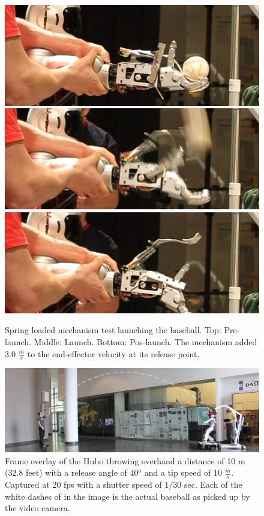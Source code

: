 \begin{figure}[t]
  \centering
\includegraphics[width=1.0\columnwidth]{./pix/finalSpring1.png}
\includegraphics[width=1.0\columnwidth]{./pix/finalSpring2.png}
\includegraphics[width=1.0\columnwidth]{./pix/finalSpring3.png}
  \caption{Spring loaded mechanism test launching the baseball.  Top: Pre-launch.  Middle: Launch.  Bottom: Pos-launch.  The mechanism added 3.0 $\frac{m}{s}$ to the end-effector velocity at its release point.}
  \label{fig:hubo-spring}
\end{figure}

\begin{figure}[t]
  \centering
\includegraphics[width=1.0\textwidth]{./pix/preThrow2.png}
  \caption{Frame overlay of the Hubo throwing overhand a distance of 10 m (32.8 feet) with a release angle of 40$^o$ and a tip speed of 10 $\frac{m}{s}$.  Captured at 20 fps with a shutter speed of 1/30 sec.  Each of the white dashes of in the image is the actual baseball as picked up by the video camera.}
  \label{fig:hubo-throw-test}
\end{figure}

